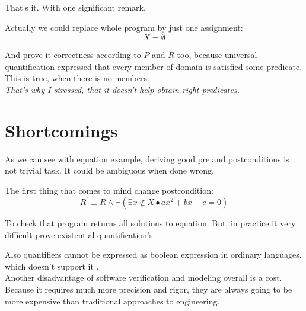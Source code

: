 \documentclass[twoside,twocolumn]{article}
\begin{document}
\rightline{{\rm $\Box$}}
\vspace{1em}

That's it. With one significant remark.

Actually we could replace whole program
by just one assignment: 
$$ X = \emptyset $$

And prove it correctness according to $P$ and $R$ too, because universal
quantification expressed that every member of domain is satisfied some
predicate. This is true, when there is no members. \\

\textit{That's why I stressed, that it doesn't help obtain right predicates. }





\section{Shortcomings}

As we can see with equation example, deriving good pre and postconditions is not
trivial task. It could be ambiguous when done wrong.

The first thing that comes to mind change postcondition:
$$ R^\prime \equiv R \wedge \neg(\exists x \not\in X \bullet ax^2 + bx + c = 0)$$

To check that program returns all solutions to equation. But, in practice it
very difficult prove existential quantification's.

Also quantifiers cannot be expressed as boolean expression in ordinary
languages, which doesn't support it \cite{meyer:90}.\\

Another disadvantage of software verification and modeling overall is a cost.
Because it requires much more precision and rigor, they are always going to be
more expensive than traditional approaches to engineering. 

\end{document}

